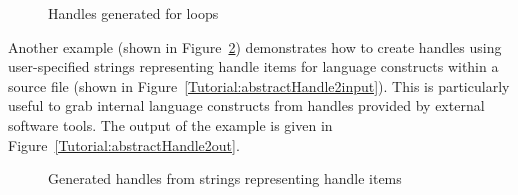 \begin{figure}[!h]
{\indent
{\mySmallestFontSize
\begin{latexonly}
  
\end{latexonly}

\begin{htmlonly}
   
\end{htmlonly}

}
}
\caption{Handles generated for loops}
\label{Tutorial:abstractHandle1out}
\end{figure}

Another example (shown in Figure~\ref{Tutorial:abstractHandle2})
demonstrates how to create handles using user-specified strings
representing handle items for language constructs within a source file
(shown in Figure~\ref{Tutorial:abstractHandle2input}). 
This is particularly useful to grab internal language constructs from handles provided by external software tools. 
The output of the example is given in Figure~\ref{Tutorial:abstractHandle2out}.

\begin{figure}[!h]
{\indent
{\mySmallestFontSize
\begin{latexonly}
  
\end{latexonly}

\begin{htmlonly}
   
\end{htmlonly}

}
}
\caption{Generated handles from strings representing handle items}
\label{Tutorial:abstractHandle2}
\end{figure}

